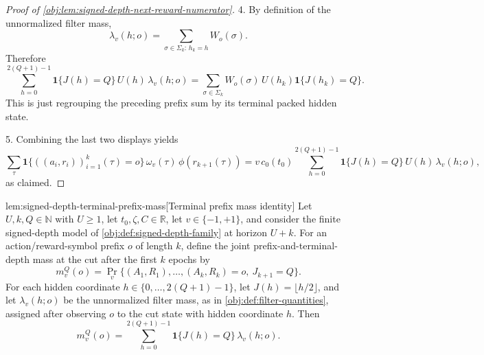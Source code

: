 \documentclass[11pt]{article}
\begin{document}
\begin{proof}[Proof of \cref{obj:lem:signed-depth-next-reward-numerator}]
4.  By definition of the unnormalized filter mass,
\[
\lambda_v(h;o)
=
\sum_{\sigma\in\Sigma_k:\,h_k=h} W_o(\sigma).
\]
Therefore
\[
\sum_{h=0}^{2(Q+1)-1}
\mathbf 1\{J(h)=Q\}\,U(h)\,\lambda_v(h;o)
=
\sum_{\sigma\in\Sigma_k}
W_o(\sigma)\,U(h_k)\mathbf 1\{J(h_k)=Q\}.
\]
This is just regrouping the preceding prefix sum by its terminal packed hidden state. %

5.  Combining the last two displays yields
\[
\sum_{\tau}
\mathbf 1\{((a_i,r_i))_{i=1}^k(\tau)=o\}
\,\omega_v(\tau)\,\phi(r_{k+1}(\tau))
=
v\,c_0(t_0)
\sum_{h=0}^{2(Q+1)-1}
\mathbf 1\{J(h)=Q\}\,U(h)\,\lambda_v(h;o),
\]
as claimed. %
\end{proof}

\begin{lemmav}{lem:signed-depth-terminal-prefix-mass}[Terminal prefix mass identity]
Let \(U,k,Q\in\mathbb N\) with \(U\ge 1\), let \(t_0,\zeta,C\in\mathbb R\), let \(v\in\{-1,+1\}\), and consider the finite signed-depth model of \cref{obj:def:signed-depth-family} at horizon \(U+k\).  For an action/reward-symbol prefix \(o\) of length \(k\), define the joint prefix-and-terminal-depth mass at the cut after the first \(k\) epochs by
\[
m_v^Q(o)
=
\Pr_v\{(A_1,R_1),\ldots,(A_k,R_k)=o,\ J_{k+1}=Q\}.
\]
For each hidden coordinate \(h\in\{0,\ldots,2(Q+1)-1\}\), let \(J(h)=\lfloor h/2\rfloor\), and let \(\lambda_v(h;o)\) be the unnormalized filter mass, as in \cref{obj:def:filter-quantities}, assigned after observing \(o\) to the cut state with hidden coordinate \(h\).  Then
\[
m_v^Q(o)
=
\sum_{h=0}^{2(Q+1)-1}
\mathbf 1\{J(h)=Q\}\,\lambda_v(h;o).
\]
\end{lemmav}
\end{document}

